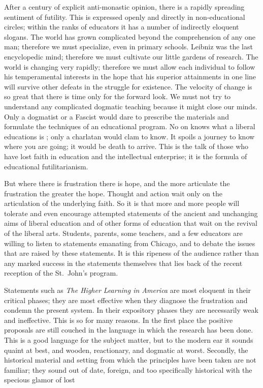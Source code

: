 \documentclass{memoir}
\begin{document}
After a century of explicit anti-monastic opinion, there is a rapidly
spreading sentiment of futility. This is expressed openly and directly
in non-educational circles; within the ranks of educators it has a
number of indirectly eloquent slogans. The world has grown complicated
beyond the comprehension of any one man; therefore we must specialize,
even in primary schools. Leibniz was the last encyclopedic mind;
therefore we must cultivate our little gardens of research. The world is
changing very rapidly; therefore we must allow each individual to follow
his temperamental interests in the hope that his superior attainments in
one line will survive other defeats in the struggle for existence. The
velocity of change is so great that  there is time only for the forward
look. We must not try to understand any complicated dogmatic teaching
because it might close our minds. Only a dogmatist or a Fascist
would dare to prescribe the materials and formulate the techniques of an
educational program. No on knows what a liberal educations is ; only a
charlatan would clam to know. It spoils a journey to know where you are
going; it would be death to arrive. This is the talk of those who have
lost faith in education and the intellectual enterprise; it is the
formula of educational futilitarianism. 

But where there is frustration there is hope, and the more articulate
the frustration the greater the hope. Thought and action wait only on
the articulation of the underlying faith. So it is that more and more
people will tolerate and even encourage attempted statements of the
ancient and unchanging aims of liberal education and of other forms of
education that wait on the revival of the liberal arts. Students,
parents, some teachers, and a few educators are willing to listen to
statements emanating from Chicago, and to debate the issues that are
raised by these statements. It is this ripeness of the audience rather
than any marked success in the statements themselves that lies back of
the recent reception of the St.\ John's program.

Statements such as \emph{The Higher Learning in America} are most
eloquent in their critical phases; they are most effective when they
diagnose the frustration and condemn the present system. In their
expository phases they are necessarily weak and ineffective. This is so
for many reasons. In the first place the positive proposals are still
couched in the language in which the research has been done. This is a
good language for the subject matter, but to the modern ear it sounds
quaint at best, and wooden, reactionary, and dogmatic at worst.
Secondly, the historical material and setting from which the principles
have been taken are not familiar; they sound out of date, foreign, and
too specifically historical with the specious glamor of lost
\end{document}

